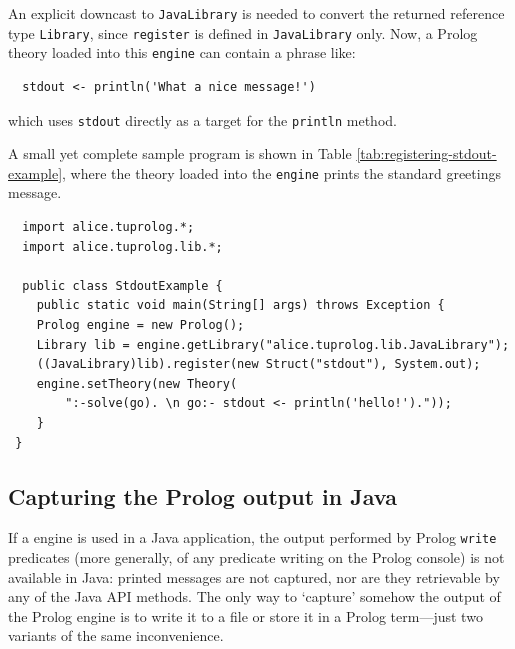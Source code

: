 \noindent An explicit downcast to \texttt{JavaLibrary} is needed to convert the returned reference type \texttt{Library}, since \texttt{register} is defined in \texttt{JavaLibrary} only.
%
Now, a Prolog theory loaded into this \texttt{engine} can contain a phrase like:
%
\begin{verbatim}
  stdout <- println('What a nice message!')
\end{verbatim}
%
which uses \texttt{stdout} directly as a target for the \texttt{println} method.

A small yet complete sample program is shown in Table \ref{tab:registering-stdout-example}, where the theory loaded into the \texttt{engine} prints the standard greetings message.

\begin{table}[h]
{\small
\begin{verbatim}
  import alice.tuprolog.*;
  import alice.tuprolog.lib.*;

  public class StdoutExample {
    public static void main(String[] args) throws Exception {
    Prolog engine = new Prolog();
    Library lib = engine.getLibrary("alice.tuprolog.lib.JavaLibrary");
    ((JavaLibrary)lib).register(new Struct("stdout"), System.out);
    engine.setTheory(new Theory(
        ":-solve(go). \n go:- stdout <- println('hello!')."));
    }
 }
\end{verbatim}}
\caption{A program registering \texttt{stdout} for \texttt{System.out}. As an alternative to \texttt{getLibrary}, \texttt{loadLibrary} could have been used---if the library is already loaded, its behavior is identical to \texttt{getLibrary}'s.
%
Also, the fully qualified class name \texttt{"alice.tuprolog.lib.JavaLibrary"} is needed in \texttt{getLibrary} only because \texttt{JavaLibrary} does \textit{not} define a short library name (see Section \ref{ssec:library-name} for details): otherwise, the shorter name could have been used.}
\label{tab:registering-stdout-example}
\end{table}

\subsection{Capturing the Prolog output in Java}
\label{ssec:capturing-output}

If a \tuprolog{} engine is used in a Java application, the output performed by Prolog \texttt{write} predicates (more generally, of any predicate writing on the Prolog console) is not available in Java: printed messages are not captured, nor are they retrievable by any of the \tuprolog{} Java API methods.
%
The only way to `capture' somehow the output of the Prolog engine is to write it to a file or store it in a Prolog term---just two variants of the same inconvenience.

